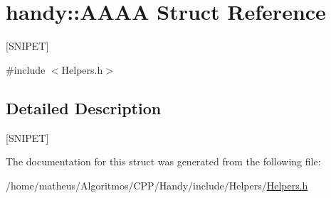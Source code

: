 \hypertarget{structhandy_1_1AAAA}{}\section{handy\+:\+:A\+A\+AA Struct Reference}
\label{structhandy_1_1AAAA}


\mbox{[}S\+N\+I\+P\+ET\mbox{]}  




{\ttfamily \#include $<$Helpers.\+h$>$}



\subsection{Detailed Description}
\mbox{[}S\+N\+I\+P\+ET\mbox{]} 

The documentation for this struct was generated from the following file\+:\begin{DoxyCompactItemize}
\item 
/home/matheus/\+Algoritmos/\+C\+P\+P/\+Handy/include/\+Helpers/\hyperlink{Helpers_2Helpers_8h}{Helpers.\+h}\end{DoxyCompactItemize}
